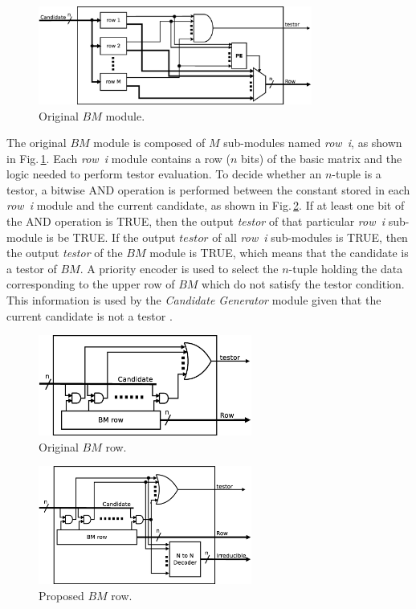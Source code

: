 \documentclass[conference]{IEEEtran}
\begin{document}
\begin{figure}[htb]
    \centering
    \includegraphics[width=9cm]{BM_module_old.eps}
	\caption{Original $BM$ module.}
	\label{figBMold}
\end{figure}

The original $BM$ module is composed of $M$ sub-modules named \textit{row~i}, as shown
in Fig.\,\ref{figBMold}. Each \textit{row~i} module contains a row ($n$ bits)
of the basic matrix and the logic needed to perform testor evaluation. To decide
whether an $n$-tuple is a testor, a bitwise AND operation is performed
between the constant stored in each \textit{row~i} module and the current
candidate, as shown in Fig.\,\ref{figBMrowOld}. If at least one bit of the AND operation is TRUE,
then the output \textit{testor} of that particular \textit{row~i} sub-module
is be TRUE. 
If the output $testor$ of all  \textit{row~i} sub-modules is
TRUE, then the output \textit{testor} of the $BM$ module is TRUE,
which means that the candidate is a testor of $BM$.
A priority encoder is used to select the $n$-tuple holding the data corresponding to the upper row 
of $BM$ which do not satisfy the testor condition. This information is used by the \textit{Candidate Generator}
module given that the current candidate is not a testor \cite{Rojas12}.

\begin{figure}[htb]
    \centering
    \includegraphics[width=7cm]{BM_row_old.eps}
	\caption{Original $BM$ row.}
	\label{figBMrowOld}
\end{figure}

\begin{figure}[htb]
    \centering
    \includegraphics[width=7cm]{BM_row_new.eps}
	\caption{Proposed $BM$ row.}
	\label{figBMrowNew}
\end{figure}
\end{document}

